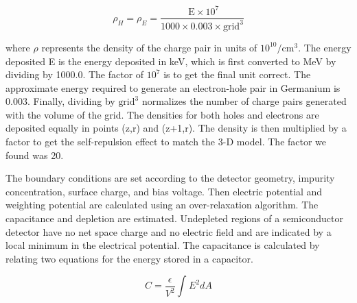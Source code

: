 \begin{equation}
    \rho_H = \rho_E= \frac{\text{ E}\times 10^7 }{1000 \times 0.003 \times \text{grid}^3}
\end{equation}

where $\rho$ represents the density of the charge pair in units of \(10^{10}/\text{cm}^3\). The energy deposited E is the energy deposited in keV, which is first converted to MeV by dividing by 1000.0. The factor of \(10^7\) is to get the final unit correct. The approximate energy required to generate an electron-hole pair in Germanium is \(0.003\). Finally, dividing by \(\text{grid}^3\) normalizes the number of charge pairs generated with the volume of the grid. The densities for both holes and electrons are deposited equally in points (z,r) and (z+1,r). The density is then multiplied by a factor to get the self-repulsion effect to match the 3-D model. The factor we found was 20.

The boundary conditions are set according to the detector geometry, impurity concentration, surface charge, and bias voltage. Then electric potential and weighting potential are calculated using an over-relaxation algorithm. The capacitance and depletion are estimated. Undepleted regions of a semiconductor detector have no net space charge and no electric field and are indicated by a local minimum in the electrical potential. The capacitance is calculated by relating two equations for the energy stored in a capacitor.

\begin{equation}\label{capacitance_eq}
C= \frac{\epsilon}{V^2} \int_{}^{} E^2 dA
\end{equation}


